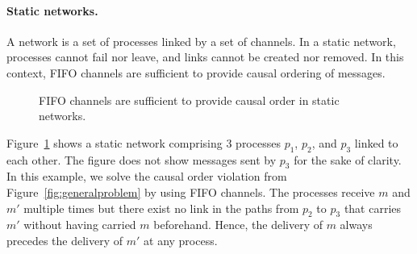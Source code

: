 \paragraph{Static networks.} A network is a set of processes linked by a set of
channels. In a static network, processes cannot fail nor leave, and links cannot
be created nor removed. In this context, FIFO channels are sufficient to provide
causal ordering of messages.

\begin{figure}
  \begin{center}
    
    \caption{\label{fig:static}FIFO channels are sufficient to provide causal
      order in static networks.}
  \end{center}
\end{figure}

Figure~\ref{fig:static} shows a static network comprising 3 processes $p_1$,
$p_2$, and $p_3$ linked to each other. The figure does not show messages sent by
$p_3$ for the sake of clarity. In this example, we solve the causal order
violation from Figure~\ref{fig:generalproblem} by using FIFO channels. The
processes receive $m$ and $m'$ multiple times but there exist no link in the
paths from $p_2$ to $p_3$ that carries $m'$ without having carried $m$
beforehand. Hence, the delivery of $m$ always precedes the delivery of $m'$ at
any process.

\begin{theorem}
\end{theorem}

